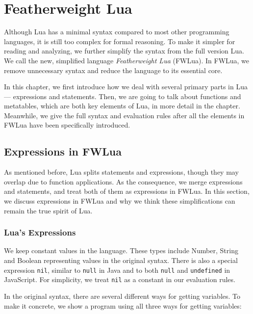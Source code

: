 \newcommand{\abFunction}[2]{{\tt function} ~{#1}~{\tt return}~{#2}~{\tt end}}
\newcommand{\semanticFullRaw}[4]{{#1},{#2} \Downarrow {#3},{#4}}
\newcommand{\semanticFull}[4]{{#1},{#2} \Downarrow {#3}, {#4}}

\chapter{Featherweight Lua}\label{chp: FWLua}
Although Lua has a minimal syntax compared to most other programming languages, it is still too complex for formal reasoning. To make it simpler for reading and analyzing, we further simplify the syntax from the full version Lua. We call the new, simplified language {\it Featherweight Lua} (FWLua). In FWLua, we remove unnecessary syntax and reduce the language to its essential core.

In this chapter, we first introduce how we deal with several primary parts in Lua --- expressions and statements. Then, we are going to talk about functions and metatables, which are both key elements of Lua, in more detail in the chapter. Meanwhile, we give the full syntax and evaluation rules after all the elements in FWLua have been specifically introduced.

\section{Expressions in FWLua}
As mentioned before, Lua splits statements and expressions, though they may overlap due to function applications. As the consequence, we merge expressions and statements, and treat both of them as expressions in FWLua. In this section, we discuss expressions in FWLua and why we think these simplifications can remain the true spirit of Lua. 

\subsection{Lua's Expressions}
We keep constant values in the language.
These types include Number, String and Boolean representing values in the original syntax.
There is also a special expression {\tt nil}, similar to {\tt null} in Java and to both {\tt null} and {\tt undefined} in JavaScript.
For simplicity, we treat {\tt nil} as a constant in our evaluation rules.

In the original syntax,
there are several different ways for getting variables.
To make it concrete, we show a program using all three ways for getting variables:

